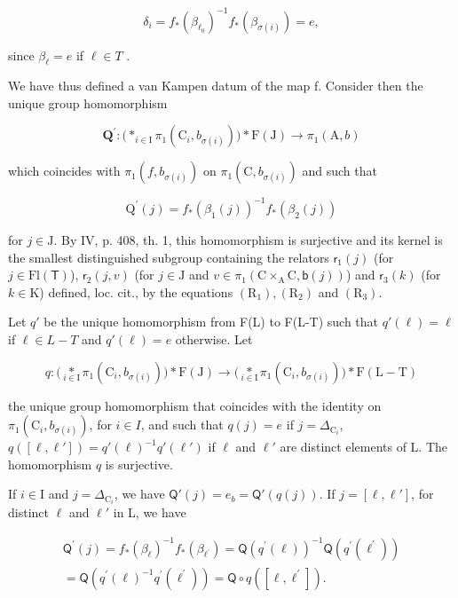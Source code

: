 \[
\delta_ {i} = f _ {*} (\beta_ {\ell_ {0}}) ^ {- 1} f _ {*} (\beta_ {\sigma (i)}) = e,
\]

since \(\beta_{\ell} = e\) if \(\ell \in T\) .

We have thus defined a van Kampen datum of the map f. Consider then the unique group homomorphism

\[
\mathbf {Q} ^ {\prime} \colon \big (\ast_ {i \in \mathrm{I}} \pi_ {1} (\mathrm{C} _ {i}, b _ {\sigma (i)}) \big) * \mathrm{F} (\mathrm{J}) \to \pi_ {1} (\mathrm{A}, b)
\]

which coincides with \(\pi_1(f, b_{\sigma(i)})\) on \(\pi_1(\mathrm{C}, b_{\sigma(i)})\) and such that

\[
\mathrm{Q} ^ {\prime} (j) = f _ {*} (\beta_ {1} (j)) ^ {- 1} f _ {*} (\beta_ {2} (j))
\]

for \(j \in \mathrm{J}\). By IV, p. 408, th. 1, this homomorphism is surjective and its kernel is the smallest distinguished subgroup containing the relators \(\mathsf{r}_1(j)\) (for \(j \in \mathrm{Fl}(\mathsf{T})\)), \(\mathsf{r}_2(j,v)\) (for \(j \in \mathrm{J}\) and \(v \in \pi_1(\mathrm{C} \times_{\mathrm{A}} \mathrm{C}, \mathsf{b}(j))\)) and \(\mathsf{r}_3(k)\) (for \(k \in \mathrm{K}\)) defined, loc. cit., by the equations \((\mathrm{R}_1), (\mathrm{R}_2)\) and \((\mathrm{R}_3)\).

Let \(q'\) be the unique homomorphism from F(L) to F(L-T) such that \(q'(\ell) = \ell\) if \(\ell \in L - T\) and \(q'(\ell) = e\) otherwise. Let

\[
q \colon \big (\underset {i \in \mathrm{I}} {\ast} \pi_ {1} (\mathrm{C} _ {i}, b _ {\sigma (i)}) \big) \ast \mathrm{F(J)} \to \big (\underset {i \in \mathrm{I}} {\ast} \pi_ {1} (\mathrm{C} _ {i}, b _ {\sigma (i)}) \big) \ast \mathrm{F(L-T)}
\]

the unique group homomorphism that coincides with the identity on \(\pi_{1}(\mathrm{C}_{i},b_{\sigma(i)})\), for \(i\in I\), and such that \(q(j)=e\) if \(j=\Delta_{\mathrm{C}_{i}}\), \(q([\ell,\ell'])=q'(\ell)^{-1}q'(\ell')\) if \(\ell\) and \(\ell'\) are distinct elements of L. The homomorphism \(q\) is surjective.

If \(i \in \mathrm{I}\) and \(j = \Delta_{\mathrm{C}_i}\), we have \(\mathsf{Q}'(j) = e_b = \mathsf{Q}'(q(j))\). If \(j = [\ell, \ell']\), for distinct \(\ell\) and \(\ell'\) in L, we have

\[
\begin{array}{c} \mathsf {Q} ^ {\prime} (j) = f _ {*} (\beta_ {\ell}) ^ {- 1} f _ {*} (\beta_ {\ell^ {\prime}}) = \mathsf {Q} (q ^ {\prime} (\ell)) ^ {- 1} \mathsf {Q} (q ^ {\prime} (\ell^ {\prime})) \\ = \mathsf {Q} (q ^ {\prime} (\ell) ^ {- 1} q ^ {\prime} (\ell^ {\prime})) = \mathsf {Q} \circ q ([ \ell , \ell^ {\prime} ]). \end{array}
\]

